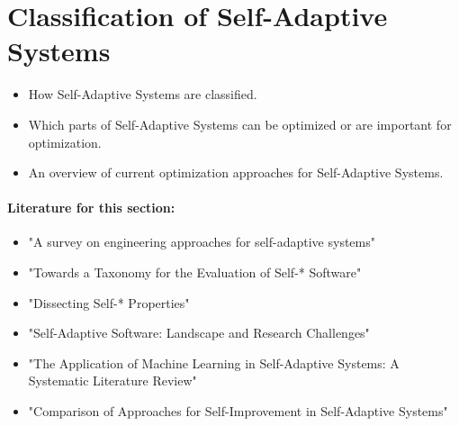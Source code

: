 \newpage
\section{Classification of Self-Adaptive Systems}
\label{ch:SASClassification}

\begin{itemize}
    \item How Self-Adaptive Systems are classified.
    \item Which parts of Self-Adaptive Systems can be optimized or are important for optimization.
    \item An overview of current optimization approaches for Self-Adaptive Systems.
\end{itemize}

\paragraph*{Literature for this section:} \begin{itemize}
    \item "A survey on engineering approaches for self-adaptive systems" \cite{KRUPITZER2015184}
    \item "Towards a Taxonomy for the Evaluation of Self-* Software" \cite{8599527}
    \item "Dissecting Self-* Properties" \cite{5298493}
    \item "Self-Adaptive Software: Landscape and Research Challenges" \cite{10.1145/1516533.1516538}
    \item "The Application of Machine Learning in Self-Adaptive Systems: A Systematic Literature Review" \cite{9249012}
    \item "Comparison of Approaches for Self-Improvement in Self-Adaptive Systems" \cite{7573157}
\end{itemize}